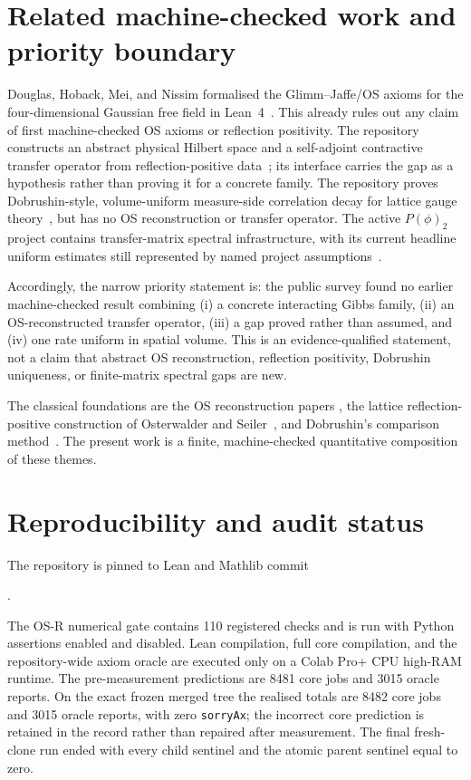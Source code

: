 \documentclass[11pt]{article}
\begin{document}
\section{Related machine-checked work and priority boundary}

Douglas, Hoback, Mei, and Nissim formalised the Glimm--Jaffe/OS axioms for the
four-dimensional Gaussian free field in Lean~4~\cite{douglas2026}.  This
already rules out any claim of first machine-checked OS axioms or reflection
positivity. The repository 
constructs an abstract physical Hilbert space and a self-adjoint contractive
transfer operator from reflection-positive data~\cite{reflectionrepo}; its
 interface carries the gap as a hypothesis rather than
proving it for a concrete family. The repository 
proves Dobrushin-style, volume-uniform measure-side correlation decay for
lattice gauge theory~\cite{lgtrepo}, but has no OS reconstruction or transfer
operator.  The active $P(\phi)_2$ project contains transfer-matrix spectral
infrastructure, with its current headline uniform estimates still represented
by named project assumptions~\cite{pphi2repo}.

Accordingly, the narrow priority statement is: the public survey found no
earlier machine-checked result combining (i) a concrete interacting Gibbs
family, (ii) an OS-reconstructed transfer operator, (iii) a gap proved rather
than assumed, and (iv) one rate uniform in spatial volume.  This is an
evidence-qualified statement, not a claim that abstract OS reconstruction,
reflection positivity, Dobrushin uniqueness, or finite-matrix spectral gaps
are new.

The classical foundations are the OS reconstruction papers
\cite{os1973,os1975}, the lattice reflection-positive construction of
Osterwalder and Seiler~\cite{osterwalderseiler1978}, and Dobrushin's
comparison method~\cite{dobrushin1968}.  The present work is a finite,
machine-checked quantitative composition of these themes.

\section{Reproducibility and audit status}

The repository is pinned to Lean  and Mathlib commit
\begin{center}
.
\end{center}
The OS-R numerical gate contains 110 registered checks and is run with Python assertions enabled and
disabled.  Lean compilation, full core compilation, and the repository-wide
axiom oracle are executed only on a Colab Pro+ CPU high-RAM runtime.  The
pre-measurement predictions are 8481 core jobs and 3015 oracle reports.
On the exact frozen merged tree the realised totals are 8482 core jobs and
3015 oracle reports, with zero \texttt{sorryAx}; the incorrect core prediction
is retained in the record rather than repaired after measurement.  The final
fresh-clone run ended with every child sentinel and the atomic parent sentinel
equal to zero.
\end{document}
